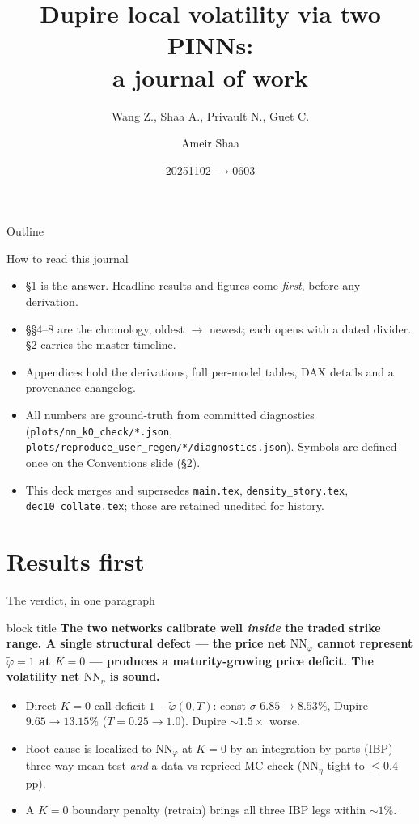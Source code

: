 \documentclass[aspectratio=169,11pt]{beamer}
\title{Dupire local volatility via two PINNs:\\a journal of work}
\subtitle{Wang Z., Shaa A., Privault N., Guet C.}
\author{Ameir Shaa}
\date{2025\text{-}11\text{-}02 \;$\to$\; 2026\text{-}06\text{-}03}
\institute{JCF manuscript --- LocalVolatility PINN pipeline \;\textbar\; canonical reference (supersedes \texttt{main} / \texttt{density\_story} / \texttt{dec10\_collate})}
\newcommand{\gold}[1]{{\color{ntugold}#1}}
\newcommand{\red}[1]{{\color{ntured}#1}}
\newenvironment{verdict}{\begin{beamercolorbox}[sep=6pt,rounded=true,wd=\linewidth]{block title}\bfseries}{\end{beamercolorbox}}
\begin{document}
\maketitle

\begin{frame}{Outline}
  \tableofcontents
\end{frame}

\begin{frame}{How to read this journal}
  \begin{itemize}
    \item \gold{\S1 is the answer.} Headline results and figures come \emph{first}, before any derivation.
    \item \gold{\S\S4--8 are the chronology}, oldest $\to$ newest; each opens with a dated divider. \S2 carries the master timeline.
    \item \gold{Appendices} hold the derivations, full per-model tables, DAX details and a provenance changelog.
    \item All numbers are ground-truth from committed diagnostics
          (\texttt{plots/nn\_k0\_check/*.json}, \texttt{plots/reproduce\_user\_regen/*/diagnostics.json}).
          Symbols are defined once on the \gold{Conventions} slide (\S2).
    \item This deck \red{merges and supersedes} \texttt{main.tex}, \texttt{density\_story.tex},
          \texttt{dec10\_collate.tex}; those are retained unedited for history.
  \end{itemize}
\end{frame}

\section{Results first}

\begin{frame}{The verdict, in one paragraph}
  \begin{verdict}
  The two networks calibrate well \emph{inside} the traded strike range. A single
  structural defect --- the price net $\mathrm{NN}_\varphi$ cannot represent
  $\tilde\varphi=1$ at $K=0$ --- produces a maturity-growing price deficit. The
  volatility net $\mathrm{NN}_\eta$ is sound.
  \end{verdict}
  \vspace{0.5em}
  \begin{itemize}
    \item Direct $K=0$ call deficit $1-\tilde\varphi(0,T)$:
          \gold{const-$\sigma$ $6.85\!\to\!8.53\%$}, \gold{Dupire $9.65\!\to\!13.15\%$}
          ($T=0.25\!\to\!1.0$). Dupire $\sim\!1.5\times$ worse.
    \item Root cause is localized to $\mathrm{NN}_\varphi$ at $K=0$ by an integration-by-parts
          (IBP) three-way mean test \emph{and} a data-vs-repriced MC check ($\mathrm{NN}_\eta$ tight to $\le0.4$\,pp).
    \item A $K=0$ boundary penalty (retrain) brings all three IBP legs \gold{within $\sim\!1\%$}.
  \end{itemize}
\end{frame}
\end{document}
